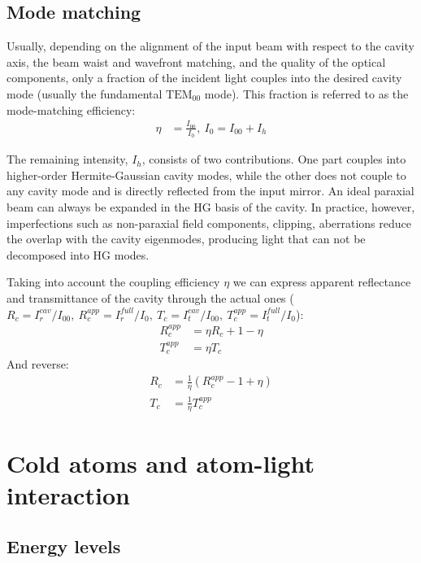 \documentclass{article}
\numberwithin{equation}{section}
\begin{document}
\subsection{Mode matching}
Usually, depending on the alignment of the input beam with respect to the cavity axis, the beam waist and wavefront matching, and the quality of the optical components, only a fraction of the incident light couples into the desired cavity mode (usually the fundamental $\text{TEM}_{00}$ mode). This fraction is referred to as the mode-matching efficiency:
\begin{align}
    \eta &= \frac{I_{00}}{I_0}, ~ I_0 = I_{00} + I_h
\end{align}

The remaining intensity, $I_h$, consists of two contributions. One part couples into higher-order Hermite-Gaussian cavity modes, while the other does not couple to any cavity mode and is directly reflected from the input mirror. An ideal paraxial beam can always be expanded in the HG basis of the cavity. In practice, however, imperfections such as  non-paraxial field components, clipping, aberrations reduce the overlap with the cavity eigenmodes, producing light that can not be decomposed into HG modes.



Taking into account the coupling efficiency $\eta$ we can express apparent reflectance and transmittance of the cavity through the actual ones ($R_c = I_r^{cav}/I_{00}, ~R_c^{app} = I_r^{full}/I_{0}, ~T_c = I_t^{cav}/I_{00}, ~T_c^{app} = I_t^{full}/I_{0}$):
\begin{align}
    R_c^{app} &= \eta R_c + 1 - \eta \\
    T_c^{app} &= \eta T_c
\end{align}
And reverse:
\begin{align}
    R_c &= \frac{1}{\eta} (R_c^{app} - 1 + \eta) \\
    T_c &= \frac{1}{\eta} T_c^{app}
\end{align}

\newpage


\section{Cold atoms and atom-light interaction}

\subsection{Energy levels} 
\label{sec_energy_levels}
\end{document}
